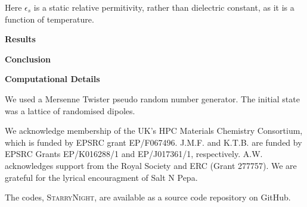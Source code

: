 \documentclass[journal=jacsat,manuscript=communication]{achemso}
\begin{document}
Here $\epsilon_s$ is a static relative permitivity, rather than dielectric constant, as it is a function of temperature.

\textbf{Results}

\textbf{Conclusion}

\textbf{Computational Details}

We used a Mersenne Twister\cite{matsumoto_mersenne_1998} pseudo random number generator. The initial state was a lattice of randomised dipoles.


\begin{acknowledgement}
We acknowledge membership of the UK's HPC Materials Chemistry Consortium, which is funded by EPSRC grant EP/F067496. 
J.M.F. and K.T.B. are funded by EPSRC Grants EP/K016288/1 and EP/J017361/1, respectively.
A.W. acknowledges support from the Royal Society and ERC (Grant 277757). 
We are grateful for the lyrical encouragment of Salt N Pepa. 
\end{acknowledgement}

\begin{suppinfo}
    The codes, \textsc{StarryNight}, are available as a source code repository on GitHub\cite{GitHub}.
\end{suppinfo}


\end{document}
